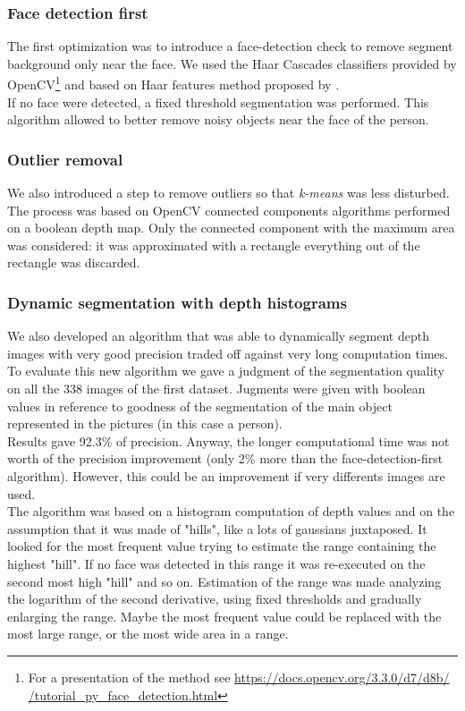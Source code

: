 \documentclass[twoside,twocolumn]{article}
\begin{document}
\subsubsection{Face detection first}
The first optimization was to introduce a face-detection check to remove
segment background only near the face. We used the Haar Cascades classifiers
provided by OpenCV\footnote{For a presentation of the method see \href{https://docs.opencv.org/3.3.0/d7/d8b/tutorial_py_face_detection.html}{https://docs.opencv.org/3.3.0/d7/d8b/\\
/tutorial\_py\_face\_detection.html}}
and based on Haar features method proposed by \citep{ViolaJones}.
\\
If no face were detected, a fixed threshold segmentation was performed.
This algorithm allowed to better remove noisy objects near the face of
the person.

\subsubsection{Outlier removal}
We also introduced a step to remove outliers so that \textit{k-means} was
less disturbed. The process was based on OpenCV connected components
algorithms performed on a boolean depth map. Only the connected component
with the maximum area was considered: it was approximated with a rectangle
everything out of the rectangle was discarded.

\subsubsection{Dynamic segmentation with depth histograms}
We also developed an algorithm that was able to dynamically segment depth
images with very good precision traded off against very long computation times.
\\
To evaluate this new algorithm we gave a judgment of the segmentation
quality on all the 338 images of the first dataset. Jugments were given
with boolean values in reference to goodness of the segmentation of the main
object represented in the pictures (in this case a person).
\\
Results gave 92.3\% of precision. Anyway, the longer computational time was not
worth of the precision improvement (only 2\% more than the face-detection-first
algorithm). However, this could be an improvement if very differents images
are used.
\\
The algorithm was based on a histogram computation of depth values and on the
assumption that it was made of "hills", like a lots of gaussians juxtaposed. It
looked for the most frequent value trying to estimate the range containing the
highest "hill". If no face was detected in this range it was re-executed on the
second most high "hill" and so on. Estimation of the range was made analyzing
the logarithm of the second derivative, using fixed thresholds and gradually
enlarging the range. Maybe the most frequent value could be replaced with the
most large range, or the most wide area in a range.
\end{document}
